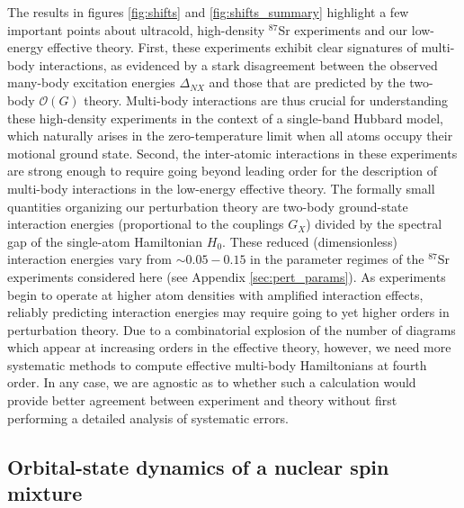 \documentclass[preprint,showkeys,nofootinbib]{revtex4-1}
\newcommand{\p}[1]{\left(#1\right)} %
\renewcommand{\O}{\mathcal{O}}
\newcommand{\1}{\mathds{1}}
\begin{document}
The results in figures \ref{fig:shifts} and \ref{fig:shifts_summary}
highlight a few important points about ultracold, high-density
${}^{87}$Sr experiments and our low-energy effective theory.  First,
these experiments exhibit clear signatures of multi-body interactions,
as evidenced by a stark disagreement between the observed many-body
excitation energies $\Delta_{NX}$ and those that are predicted by the
two-body $\O\p{G}$ theory.  Multi-body interactions are thus crucial
for understanding these high-density experiments in the context of a
single-band Hubbard model, which naturally arises in the
zero-temperature limit when all atoms occupy their motional ground
state.  Second, the inter-atomic interactions in these experiments are
strong enough to require going beyond leading order for the
description of multi-body interactions in the low-energy effective
theory.  The formally small quantities organizing our perturbation
theory are two-body ground-state interaction energies (proportional to
the couplings $G_X$) divided by the spectral gap of the single-atom
Hamiltonian $H_0$.  These reduced (dimensionless) interaction energies
vary from $\sim0.05-0.15$ in the parameter regimes of the ${}^{87}$Sr
experiments considered here (see Appendix \ref{sec:pert_params}).  As
experiments begin to operate at higher atom densities with amplified
interaction effects, reliably predicting interaction energies may
require going to yet higher orders in perturbation theory.  Due to a
combinatorial explosion of the number of diagrams which appear at
increasing orders in the effective theory, however, we need more
systematic methods to compute effective multi-body Hamiltonians at
fourth order.  In any case, we are agnostic as to whether such a
calculation would provide better agreement between experiment and
theory without first performing a detailed analysis of systematic
errors.


\subsection{Orbital-state dynamics of a nuclear spin mixture}
\end{document}

